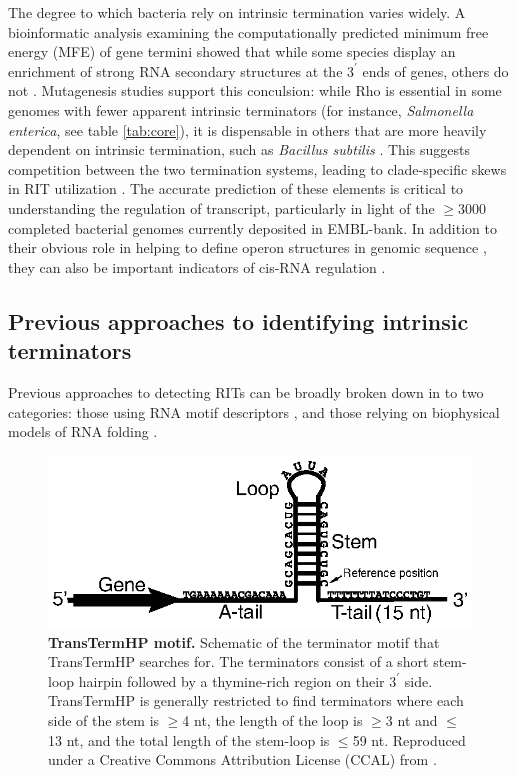 The degree to which bacteria rely on intrinsic termination varies widely. A bioinformatic analysis examining the computationally predicted minimum free energy (MFE) of gene termini showed that while some species display an enrichment of strong RNA secondary structures at the $3^\prime$ ends of genes, others do not \parencite{Washio1998}. Mutagenesis studies support this conculsion: while Rho is essential in some genomes with fewer apparent intrinsic terminators (for instance, \textit{Salmonella enterica}, see table \ref{tab:core}), it is dispensable in others that are more heavily dependent on intrinsic termination, such as \textit{Bacillus subtilis} \parencite{Quirk1993}. This suggests competition between the two termination systems, leading to clade-specific skews in RIT utilization \parencite{Carafa1990, Kroger1998, Hoon2005}. The accurate prediction of these elements is critical to understanding the regulation of transcript, particularly in light of the $\ge$3000 completed bacterial genomes currently deposited in EMBL-bank. In addition to their obvious role in helping to define operon structures in genomic sequence \parencite{Salgado2013}, they can also be important indicators of cis-RNA regulation \parencite{Henkin2002, Barrick2007, Naville2010}.

\subsection{Previous approaches to identifying intrinsic terminators}

Previous approaches to detecting RITs can be broadly broken down in to two categories: those using RNA motif descriptors \parencite{Lesnik2001, Naville2011}, and those relying on biophysical models of RNA folding \parencite{Ermolaeva2000, Wan2005, Wan2006, Kingsford2007}.

\begin{figure}[htp]
\begin{center}
\includegraphics[width=14cm]{transterm}
\caption[TransTermHP motif]{\textbf{TransTermHP motif.} Schematic of the terminator motif that TransTermHP searches for. The terminators consist of a short stem-loop hairpin followed by a thymine-rich region on their $3^\prime$ side. TransTermHP is generally restricted to find terminators where each side of the stem is $\ge$4 nt, the length of the loop is $\ge$3 nt and $\le$13 nt, and the total length of the stem-loop is $\le$59 nt. Reproduced under a Creative Commons Attribution License (CCAL) from \textcite{Kingsford2007}.
} 
\label{fig:transterm}
\end{center}
\end{figure}
